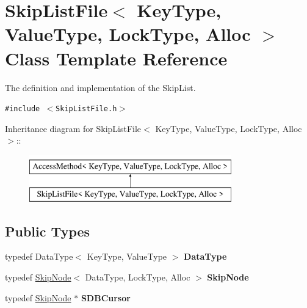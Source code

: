 \hypertarget{classSkipListFile}{
\section{SkipListFile$<$ KeyType, ValueType, LockType, Alloc $>$ Class Template Reference}
\label{classSkipListFile}
}
The definition and implementation of the SkipList.  


{\tt \#include $<$SkipListFile.h$>$}

Inheritance diagram for SkipListFile$<$ KeyType, ValueType, LockType, Alloc $>$::\begin{figure}[H]
\begin{center}
\leavevmode
\includegraphics[height=2cm]{classSkipListFile}
\end{center}
\end{figure}
\subsection*{Public Types}
\begin{CompactItemize}
\item 
\hypertarget{classSkipListFile_bd531a90961483899addb340a9486c57}{
typedef DataType$<$ KeyType, ValueType $>$ \textbf{DataType}}
\label{classSkipListFile_bd531a90961483899addb340a9486c57}

\item 
\hypertarget{classSkipListFile_13f97d1caf0f235e7df3b946d60b42cf}{
typedef \hyperlink{classSkipNode}{SkipNode}$<$ DataType, LockType, Alloc $>$ \textbf{SkipNode}}
\label{classSkipListFile_13f97d1caf0f235e7df3b946d60b42cf}

\item 
\hypertarget{classSkipListFile_a6dafe425889dee183978a3e512e8fec}{
typedef \hyperlink{classSkipNode}{SkipNode} $\ast$ \textbf{SDBCursor}}
\label{classSkipListFile_a6dafe425889dee183978a3e512e8fec}

\end{CompactItemize}
